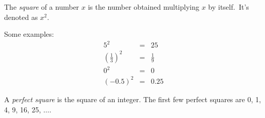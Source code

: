 \documentclass[12pt]{article}
\begin{document}
The \emph{square} of a number $x$ is the number obtained multiplying $x$ by itself.\, It's denoted as $x^2$.

Some examples:
\begin{eqnarray*}
5^2&=&25\\
\left(\frac{1}{3}\right)^2&=&\frac{1}{9}\\
0^2&=&0\\
(-0.5)^2 &=& 0.25
\end{eqnarray*}

A \emph{perfect square} is the square of an integer.  The first few perfect squares are 0, 1, 4, 9, 16, 25, $\ldots$.
\end{document}
